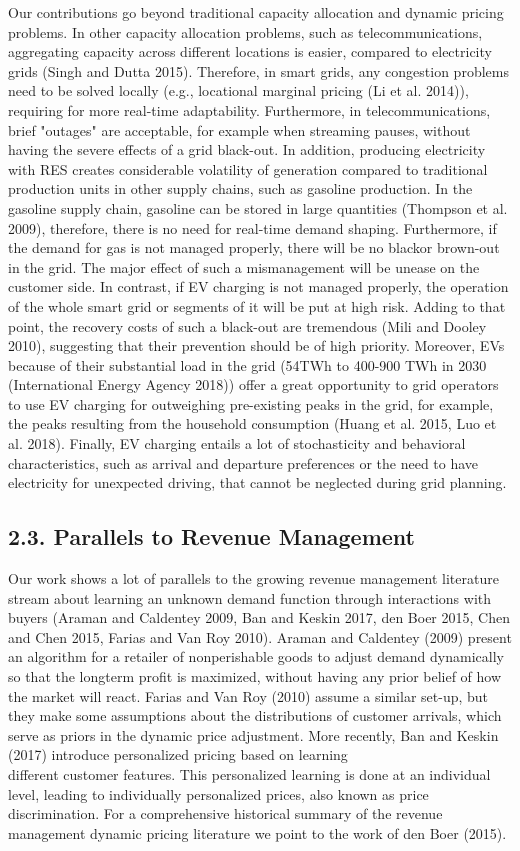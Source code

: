 \documentclass[10pt]{article}
\begin{document}
Our contributions go beyond traditional capacity allocation and dynamic pricing problems. In other capacity allocation problems, such as telecommunications, aggregating capacity across different locations is easier, compared to electricity grids (Singh and Dutta 2015). Therefore, in smart grids, any congestion problems need to be solved locally (e.g., locational marginal pricing (Li et al. 2014)), requiring for more real-time adaptability. Furthermore, in telecommunications, brief "outages" are acceptable, for example when streaming pauses, without having the severe effects of a grid black-out. In addition, producing electricity with RES creates considerable volatility of generation compared to traditional production units in other supply chains, such as gasoline production. In the gasoline supply chain, gasoline can be stored in large quantities (Thompson et al. 2009), therefore, there is no need for real-time demand shaping. Furthermore, if the demand for gas is not managed properly, there will be no blackor brown-out in the grid. The major effect of such a mismanagement will be unease on the customer side. In contrast, if EV charging is not managed properly, the operation of the whole smart grid or segments of it will be put at high risk. Adding to that point, the recovery costs of such a black-out are tremendous (Mili and Dooley 2010), suggesting that their prevention should be of high priority. Moreover, EVs because of their substantial load in the grid (54TWh to 400-900 TWh in 2030 (International Energy Agency 2018)) offer a great opportunity to grid operators to use EV charging for outweighing pre-existing peaks in the grid, for example, the peaks resulting from the household consumption (Huang et al. 2015, Luo et al. 2018). Finally, EV charging entails a lot of stochasticity and behavioral characteristics, such as arrival and departure preferences or the need to have electricity for unexpected driving, that cannot be neglected during grid planning.

\subsection*{2.3. Parallels to Revenue Management}
Our work shows a lot of parallels to the growing revenue management literature stream about learning an unknown demand function through interactions with buyers (Araman and Caldentey 2009, Ban and Keskin 2017, den Boer 2015, Chen and Chen 2015, Farias and Van Roy 2010). Araman and Caldentey (2009) present an algorithm for a retailer of nonperishable goods to adjust demand dynamically so that the longterm profit is maximized, without having any prior belief of how the market will react. Farias and Van Roy (2010) assume a similar set-up, but they make some assumptions about the distributions of customer arrivals, which serve as priors in the dynamic price adjustment. More recently, Ban and Keskin (2017) introduce personalized pricing based on learning\\
different customer features. This personalized learning is done at an individual level, leading to individually personalized prices, also known as price discrimination. For a comprehensive historical summary of the revenue management dynamic pricing literature we point to the work of den Boer (2015).
\end{document}
